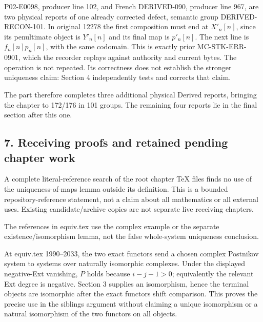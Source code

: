 P02-E0098,\allowbreak{} producer line 102,\allowbreak{} and French DERIVED-090,\allowbreak{} producer line 967,\allowbreak{} are two physical reports of one already corrected defect,\allowbreak{} semantic group DERIVED-RECON-101. In original 12278 the first composition must end at \(X'_n[n]\),\allowbreak{} since its penultimate object is \(Y'_n[n]\) and its final map is \(p'_n[n]\). The next line is \(f_n[n]p_n[n]\),\allowbreak{} with the same codomain. This is exactly prior MC-STK-ERR-0901,\allowbreak{} which the recorder replays against authority and current bytes. The operation is not repeated. Its correctness does not establish the stronger uniqueness claim:\allowbreak{} Section 4 independently tests and corrects that claim.

The part therefore completes three additional physical Derived reports,\allowbreak{} bringing the chapter to 172/\allowbreak{}176 in 101 groups. The remaining four reports lie in the final section after this one.

\subsection{7. Receiving proofs and retained pending chapter work}\label{proofs-12008-12370-receiving-proofs-and-retained-pending-chapter-work}

A complete literal-reference search of the root chapter TeX files finds no use of the uniqueness-of-maps lemma outside its definition. This is a bounded repository-reference statement,\allowbreak{} not a claim about all mathematics or all external uses. Existing candidate/\allowbreak{}archive copies are not separate live receiving chapters.

The references in equiv.tex use the complex example or the separate existence/\allowbreak{}isomorphism lemma,\allowbreak{} not the false whole-system uniqueness conclusion.

At equiv.tex 1990–\allowbreak{}2033,\allowbreak{} the two exact functors send a chosen complex Postnikov system to systems over naturally isomorphic complexes. Under the displayed negative-Ext vanishing,\allowbreak{} \(P\) holds because \(i-j-1>0\); equivalently the relevant Ext degree is negative. Section 3 supplies an isomorphism,\allowbreak{} hence the terminal objects are isomorphic after the exact functors\textquotesingle{} shift comparison. This proves the precise use in the siblings argument without claiming a unique isomorphism or a natural isomorphism of the two functors on all objects.

